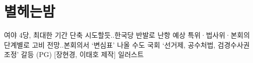 \documentclass[final,doctor,korean,pdfdoc]{konkukthesis}
\begin{document}
\chapter{별헤는밤 }
여야 4당, 최대한 기간 단축 시도할듯..한국당 반발로 난항 예상
특위·법사위·본회의 단계별로 고비 전망..본회의서 `변심표' 나올 수도
국회 `선거제, 공수처법, 검경수사권 조정' 갈등 (PG) [장현경, 이태호 제작] 일러스트
% 
% 
% 
% 
% 
% 
% 
% 
% 
% 
% 
% 
% 
% 
% 
% 
% 
% 
\end{document}
